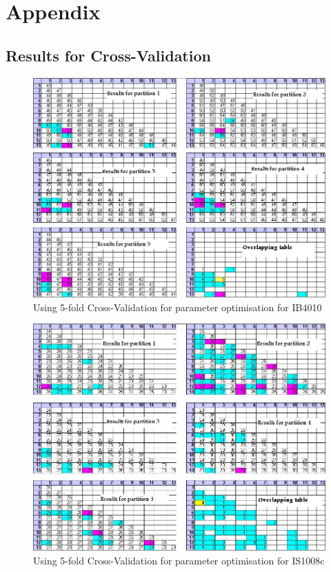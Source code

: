 \chapter*{Appendix}

\section{Results for Cross-Validation}


\begin{figure}[hb!]
\centering
\includegraphics[scale = 0.85]{IB4010_optimisation.jpg}
\caption{Using 5-fold Cross-Validation for parameter optimisation for IB4010}
\label{Using 5-fold Cross-Validation for parameter optimisation for IB4010}
\end{figure}

\pagebreak


\begin{figure}[hb!]
\centering
\includegraphics[scale = 0.85]{IS1008c_optimisation.jpg}
\caption{Using 5-fold Cross-Validation for parameter optimisation for IS1008c}
\label{Using 5-fold Cross-Validation for parameter optimisation for IS1008c}
\end{figure}

